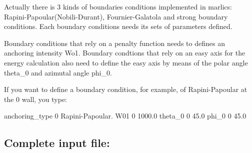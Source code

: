 \documentclass{article}
\begin{document}
Actually there is 3 kinds of boundaries conditions implemented in marlics: Rapini-Papoular(Nobili-Durant), Fournier-Galatola and strong boundary conditions. Each boundary conditions needs its sets of parameters defined.

Boundary conditions that rely on a penalty function needs to defines an anchoring intensity Wo1. Boundary condtions that rely on an easy axis for the energy calculation also need to define the easy axis by means of the polar angle theta_0 and azimutal angle phi_0.

If you want to define a boundary condition, for example, of Rapini-Papoular at the 0 wall, you type:

anchoring_type 0 Rapini-Papoular.
W01     0  1000.0
theta_0 0  45.0
phi_0   0  45.0



\subsection{Complete input file:}
\end{document}

